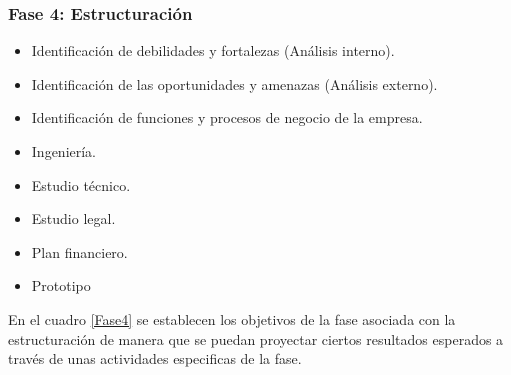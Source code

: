 \subsubsection{Fase 4: Estructuración}
\begin{itemize}
    \item Identificación de debilidades y fortalezas (Análisis interno).
    \item Identificación de las oportunidades y amenazas (Análisis externo).
    \item Identificación de funciones y procesos de negocio de la empresa.
    \item Ingeniería.
    \item Estudio técnico.
    \item Estudio legal.
    \item Plan financiero.
    \item Prototipo
\end{itemize}
En el cuadro \ref{Fase4} se establecen los objetivos de la fase asociada con la estructuración de manera que se puedan proyectar ciertos resultados esperados a través de unas actividades especificas de la fase.
